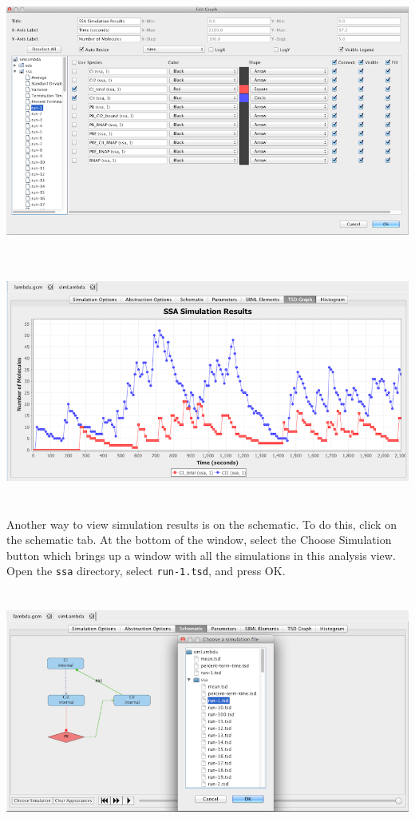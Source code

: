 \documentclass[titlepage,11pt]{article}
\begin{document}
\begin{center}
\includegraphics[height=90mm]{screenshots/ssaResults}\\
\includegraphics[height=80mm]{screenshots/ssaSimResults}
\end{center}

Another way to view simulation results is on the schematic.  To do this, click on the schematic tab.  At the bottom of the window, select the Choose Simulation button which brings up a window with all the simulations in this analysis view.  Open the {\tt ssa} directory, select {\tt run-1.tsd}, and press OK. 

\begin{center}
\includegraphics[height=80mm]{screenshots/chooseSim}
\end{center}
\end{document}
